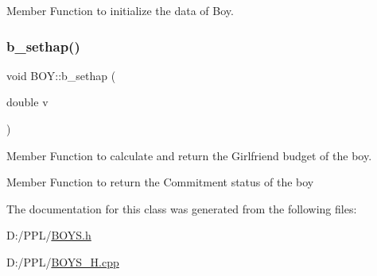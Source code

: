 Member Function to initialize the data of Boy. 

\mbox{\label{class_b_o_y_a7467385e7e4535bf141d5cf20dba30f7}} 
\subsubsection{\texorpdfstring{b\+\_\+sethap()}{b\_sethap()}}
{\footnotesize\ttfamily void B\+O\+Y\+::b\+\_\+sethap (\begin{DoxyParamCaption}\item[{double}]{v }\end{DoxyParamCaption})}



Member Function to calculate and return the Girlfriend budget of the boy. 

Member Function to return the Commitment status of the boy 

The documentation for this class was generated from the following files\+:\begin{DoxyCompactItemize}
\item 
D\+:/\+P\+P\+L/\hyperlink{_b_o_y_s_8h}{B\+O\+Y\+S.\+h}\item 
D\+:/\+P\+P\+L/\hyperlink{_b_o_y_s___h_8cpp}{B\+O\+Y\+S\+\_\+\+H.\+cpp}\end{DoxyCompactItemize}
